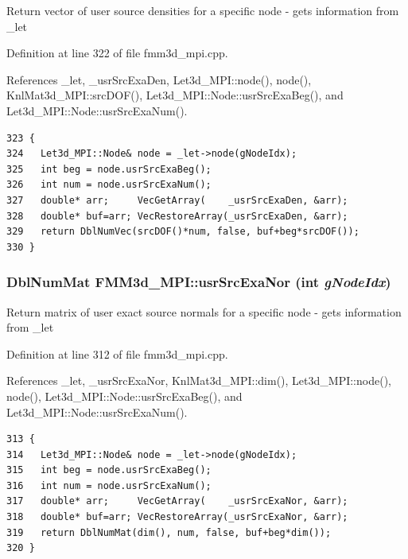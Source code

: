 Return vector of user source densities for a specific node - gets information from \_\-let 

Definition at line 322 of file fmm3d\_\-mpi.cpp.

References \_\-let, \_\-usr\-Src\-Exa\-Den, Let3d\_\-MPI::node(), node(), Knl\-Mat3d\_\-MPI::src\-DOF(), Let3d\_\-MPI::Node::usr\-Src\-Exa\-Beg(), and Let3d\_\-MPI::Node::usr\-Src\-Exa\-Num().

\footnotesize\begin{verbatim}323 {
324   Let3d_MPI::Node& node = _let->node(gNodeIdx);
325   int beg = node.usrSrcExaBeg();
326   int num = node.usrSrcExaNum();
327   double* arr;     VecGetArray(    _usrSrcExaDen, &arr);
328   double* buf=arr; VecRestoreArray(_usrSrcExaDen, &arr);
329   return DblNumVec(srcDOF()*num, false, buf+beg*srcDOF());
330 }
\end{verbatim}\normalsize 


\subsubsection{\setlength{\rightskip}{0pt plus 5cm}Dbl\-Num\-Mat FMM3d\_\-MPI::usr\-Src\-Exa\-Nor (int {\em g\-Node\-Idx})\hspace{0.3cm}{\tt  [protected]}}\label{classFMM3d__MPI_ffed6c1c344bd93c12324c9a59b12a96_ffed6c1c344bd93c12324c9a59b12a96}


Return matrix of user exact source normals for a specific node - gets information from \_\-let 

Definition at line 312 of file fmm3d\_\-mpi.cpp.

References \_\-let, \_\-usr\-Src\-Exa\-Nor, Knl\-Mat3d\_\-MPI::dim(), Let3d\_\-MPI::node(), node(), Let3d\_\-MPI::Node::usr\-Src\-Exa\-Beg(), and Let3d\_\-MPI::Node::usr\-Src\-Exa\-Num().

\footnotesize\begin{verbatim}313 {
314   Let3d_MPI::Node& node = _let->node(gNodeIdx);
315   int beg = node.usrSrcExaBeg();
316   int num = node.usrSrcExaNum();
317   double* arr;     VecGetArray(    _usrSrcExaNor, &arr);
318   double* buf=arr; VecRestoreArray(_usrSrcExaNor, &arr);
319   return DblNumMat(dim(), num, false, buf+beg*dim());
320 }
\end{verbatim}\normalsize 


